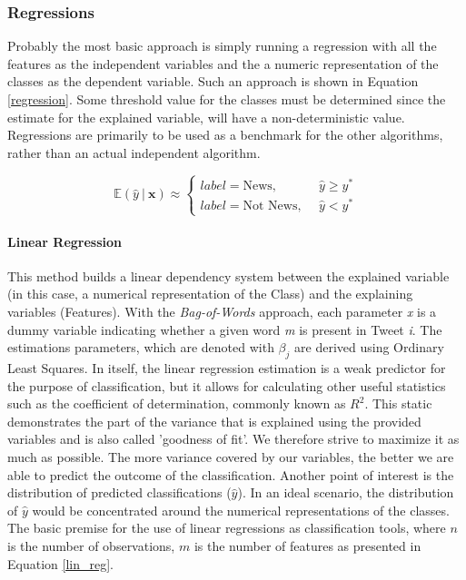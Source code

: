 	\subsubsection{Regressions}
	Probably the most basic approach is simply running a regression with all the features as the independent variables and the a numeric representation of the classes as the dependent variable. Such an approach is shown in Equation \ref{regression}. Some threshold value for the classes must be determined since the estimate for the explained variable, will have a non-deterministic value. Regressions are primarily to be used as a benchmark for the other algorithms, rather than an actual independent algorithm.
	
	\begin{equation}
		\mathbb{E}(\hat{y} \ \vert \ \textbf{x}) \approx 
		\begin{cases}
			label = \text{News}, &\hat{y} \geq y^* \\
			label = \text{Not News},\ \ &\hat{y} < y^*
		\end{cases}
		\label{regression}
	\end{equation}
	
	\par
	\paragraph{Linear Regression}
		This method builds a linear dependency system between the explained variable (in this case, a numerical representation of the Class) and the explaining variables (Features). With the \textit{Bag-of-Words} approach, each parameter \textit{x} is a dummy variable indicating whether a given word \textit{m} is present in Tweet \textit{i}. The estimations parameters, which are denoted with $\beta_j$ are derived using Ordinary Least Squares. In itself, the linear regression estimation is a weak predictor for the purpose of classification, but it allows for calculating other useful statistics such as the coefficient of determination, commonly known as $R^2$. This static demonstrates the part of the variance that is explained using the provided variables and is also called 'goodness of fit'. We therefore strive to maximize it as much as possible. The more variance covered by our variables, the better we are able to predict the outcome of the classification. Another point of interest is the distribution of predicted classifications ($\hat{y}$). In an ideal scenario, the distribution of $\hat{y}$ would be concentrated around the numerical representations of the classes.	The basic premise for the use of linear regressions as classification tools, where $ n $ is the number of observations, $ m $ is the number of features as presented in Equation \ref{lin_reg}.
	
